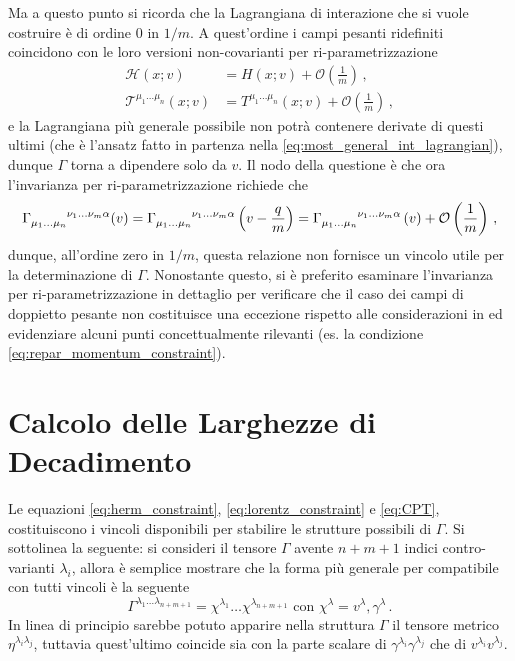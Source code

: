 \documentclass{article}
\begin{document}
Ma a questo punto si ricorda che la Lagrangiana di interazione che si vuole costruire è di ordine $0$ in $1/m$. A quest'ordine i campi pesanti ridefiniti coincidono con le loro versioni non-covarianti per ri\hyp{}parametrizzazione
\begin{align}
  \mathcal{H}(x;v) &= H(x;v) + \mathcal{O}\left(\frac{1}{m}\right) \, , \\
  \mathcal{T}^{\mu_1 \dots \mu_n}(x;v) &= T^{\mu_1 \dots \mu_n}(x;v) + \mathcal{O}\left(\frac{1}{m}\right) \, , 
\end{align}
e la Lagrangiana più generale possibile non potrà contenere derivate di questi ultimi (che è l'ansatz fatto in partenza nella \eqref{eq:most_general_int_lagrangian}), dunque $\Gamma$ torna a dipendere solo da $v$. Il nodo della questione è che ora l'invarianza per ri\hyp{}parametrizzazione richiede che
\begin{equation}
  \Gamma\indices{_{\mu_1 \dots \mu_n}^{\nu_1 \dots \nu_m \alpha}}(v) = \Gamma\indices{_{\mu_1 \dots \mu_n}^{\nu_1 \dots \nu_m \alpha}}\left( v - \frac{q}{m} \right) = \Gamma\indices{_{\mu_1 \dots \mu_n}^{\nu_1 \dots \nu_m \alpha}}\left( v \right) + \mathcal{O}\left(\frac{1}{m}\right) \, , 
\end{equation}
dunque, all'ordine zero in $1/m$, questa relazione non fornisce un vincolo utile per la determinazione di $\Gamma$. Nonostante questo, si è preferito esaminare l'invarianza per ri\hyp{}parametrizzazione in dettaglio per verificare che il caso dei campi di doppietto pesante non costituisce una eccezione rispetto alle considerazioni in \cite{article:Luke_Manohar} ed evidenziare alcuni punti concettualmente rilevanti (es. la condizione \eqref{eq:repar_momentum_constraint}).

\section{Calcolo delle Larghezze di Decadimento}

Le equazioni \eqref{eq:herm_constraint}, \eqref{eq:lorentz_constraint} e \eqref{eq:CPT}, costituiscono i vincoli disponibili per stabilire le strutture possibili di $\Gamma$. Si sottolinea la seguente: si consideri il tensore $\Gamma$ avente $n+m+1$ indici contro\hyp{}varianti $\lambda_i$, allora è semplice mostrare che la forma più generale per \Gamma compatibile con tutti vincoli è la seguente
\begin{equation}
  \Gamma^{\lambda_1 \dots \lambda_{n+m+1}} = \chi^{\lambda_1} \dots \chi^{\lambda_{n+m+1}} \text{ con } \chi^\lambda = v^\lambda, \gamma^\lambda \, .
\end{equation}
In linea di principio sarebbe potuto apparire nella struttura $\Gamma$ il tensore metrico $\eta^{\lambda_i \lambda_j}$, tuttavia quest'ultimo coincide sia con la parte scalare di $\gamma^{\lambda_i} \gamma^{\lambda_j}$ che di $v^{\lambda_i} v^{\lambda_j}$.
\end{document}
